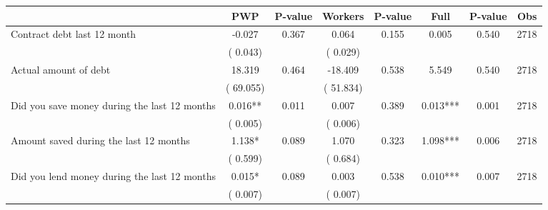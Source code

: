 
\begin{tabular}{l*{7}{c}}\hline&\multicolumn{1}{c}{PWP}&\multicolumn{1}{c}{P-value}&\multicolumn{1}{c}{Workers}&\multicolumn{1}{c}{P-value}&\multicolumn{1}{c}{Full}&\multicolumn{1}{c}{P-value}&\multicolumn{1}{c}{Obs} \\ \hline

 Contract debt last 12 month       &             -0.027       &        0.367  &              0.064       &        0.155  &              0.005       &              0.540 &  2718 \\ 
                       &       (       0.043)             &                               &       (       0.029)                     &                               &                                               &                                &                      \\ 

 Actual amount of debt       &             18.319       &        0.464  &            -18.409       &        0.538  &              5.549       &              0.540 &  2718 \\ 
                       &       (      69.055)             &                               &       (      51.834)                     &                               &                                               &                                &                      \\ 

 Did you save money during the last 12 months       &              0.016**       &        0.011  &              0.007       &        0.389  &              0.013***       &              0.001 &  2718 \\ 
                       &       (       0.005)             &                               &       (       0.006)                     &                               &                                               &                                &                      \\ 

 Amount saved during the last 12 months       &              1.138*       &        0.089  &              1.070       &        0.323  &              1.098***       &              0.006 &  2718 \\ 
                       &       (       0.599)             &                               &       (       0.684)                     &                               &                                               &                                &                      \\ 

 Did you lend money during the last 12 months       &              0.015*       &        0.089  &              0.003       &        0.538  &              0.010***       &              0.007 &  2718 \\ 
                       &       (       0.007)             &                               &       (       0.007)                     &                               &                                               &                                &                      \\ 

\hline \end{tabular}